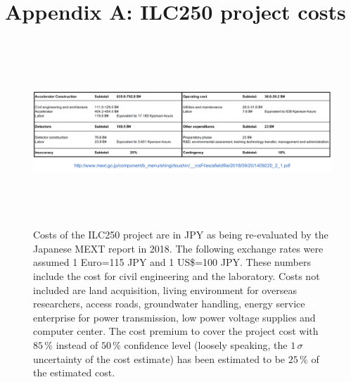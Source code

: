 \documentclass[%
 reprint,
 amsmath,amssymb,
 aps,
]{revtex4-1}
\begin{document}
\vspace{-.4cm}

%


\vspace{-.3cm}

\onecolumngrid
\newpage

\appendix


\section*{\label{Appendix1} \Large{Appendix A: ILC250 project costs}} 

\begin{figure}[ht]
 \begin{center}
 \includegraphics[width=18cm, height=7cm]{figures/Cost.png}
\caption{Costs of the ILC250 project are in JPY as being re-evaluated by the Japanese MEXT report in 2018. 
The following exchange rates were assumed 1 Euro=115 JPY and 1 US\$=100 JPY. These numbers include the cost for civil engineering and the laboratory. Costs not included are land acquisition, living environment for overseas researchers, access roads, groundwater handling, energy service enterprise for power transmission, low power voltage supplies and computer center. The cost premium to cover the project cost with $85\,\%$ instead of
$50\,\%$ confidence level (loosely speaking, the $1\,\sigma$ 
uncertainty of the cost estimate) has been estimated
 to be $25\,\%$ of the estimated cost. 
 \label{Cost}}
 \end{center}
 \end{figure}
\end{document}
